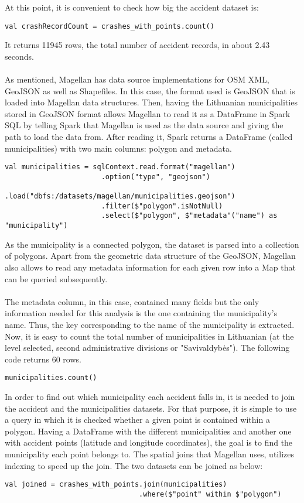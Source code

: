 At this point, it is convenient to check how big the accident dataset is:
\\
\begin{lstlisting}[style=myScalastyle]
val crashRecordCount = crashes_with_points.count()
\end{lstlisting}
It returns 11945 rows, the total number of accident records, in about 2.43 seconds.
\\
\\
As mentioned, Magellan has data source implementations for \ac{OSM} \ac{XML}, GeoJSON as well as Shapefiles. In this case, the format used is GeoJSON that is loaded into Magellan data structures. Then, having the Lithuanian municipalities stored in GeoJSON format allows Magellan to read it as a DataFrame in Spark SQL by telling Spark that Magellan is used as the data source and giving the path to load the data from.
After reading it, Spark returns a DataFrame (called municipalities) with two main columns: polygon and metadata. 
\begin{lstlisting}[style=myScalastyle]
val municipalities = sqlContext.read.format("magellan")
                       .option("type", "geojson")
                       .load("dbfs:/datasets/magellan/municipalities.geojson")
                       .filter($"polygon".isNotNull)
                       .select($"polygon", $"metadata"("name") as "municipality")
\end{lstlisting}
As the municipality is a connected polygon, the dataset is parsed into a collection of polygons. Apart from the geometric data structure of the GeoJSON, Magellan also allows to read any metadata information for each given row into a Map that can be queried subsequently.
\\
\\
The metadata column, in this case, contained many fields but the only information needed for this analysis is the one containing the municipality's name. Thus, the key corresponding to the name of the municipality is extracted. Now, it is easy to count the total number of municipalities in Lithuanian (at the level selected, second administrative divisions or "Savivaldybės"). The following code returns 60 rows.
\\
\begin{lstlisting}[style=myScalastyle]
municipalities.count()
\end{lstlisting}
In order to find out which municipality each accident falls in, it is needed to join the accident and the municipalities datasets. For that purpose, it is simple to use a query in which it is checked whether a given point is contained within a polygon. Having a DataFrame with the different municipalities and another one with accident points (latitude and longitude coordinates), the goal is to find the municipality each point belongs to. 
The spatial joins that Magellan uses, utilizes indexing to speed up the join. The two datasets can be joined as below:
\\
\begin{lstlisting}[style=myScalastyle]
val joined = crashes_with_points.join(municipalities)
                                .where($"point" within $"polygon")
\end{lstlisting}
        
